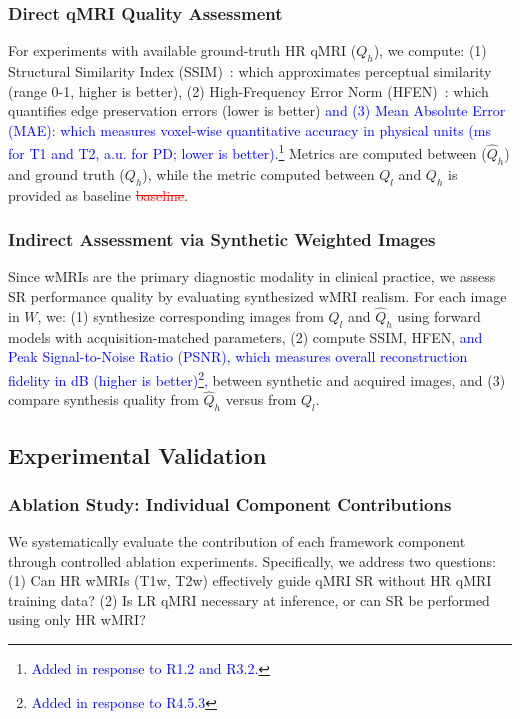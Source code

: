 \documentclass[journal,twoside,web]{ieeecolor}
\newcommand{\added}[1]{\textcolor{blue}{#1}}      %
\newcommand{\deleted}[1]{\textcolor{red}{\st{#1}}} %
\begin{document}
\subsubsection{Direct qMRI Quality Assessment}
For experiments with available ground-truth HR qMRI ($Q_h$), we compute: (1) Structural Similarity Index (SSIM)~\cite{b24}: which approximates perceptual similarity (range 0-1, higher is better), (2) High-Frequency Error Norm (HFEN)~\cite{b25}: which quantifies edge preservation errors (lower is better) \added{and (3) Mean Absolute Error (MAE): which measures voxel-wise quantitative accuracy in physical units (ms for T1 and T2, a.u. for PD; lower is better).\footnote{\textcolor{blue}{Added in response to R1.2 and R3.2.}}} Metrics are computed between ($\hat{Q}_h$) and ground truth ($Q_h$), while the metric computed between $Q_l$ and $Q_h$ is provided as baseline \deleted{baseline}.

\subsubsection{Indirect Assessment via Synthetic Weighted Images}
Since wMRIs are the primary diagnostic modality in clinical practice, 
we assess SR performance quality by evaluating synthesized wMRI 
realism. For each image in $W$, we: (1) synthesize corresponding 
images from $Q_l$ and $\hat{Q}_h$ using forward models with 
acquisition-matched parameters, (2) compute SSIM, HFEN, \added{and 
Peak Signal-to-Noise Ratio (PSNR), which measures overall 
reconstruction fidelity in dB (higher is better)\footnote{\textcolor{blue}{Added in response to R4.5.3}},} between synthetic 
and acquired images, and (3) compare synthesis quality from $\hat{Q}_h$ 
versus from $Q_l$.


\subsection{Experimental Validation}

\subsubsection{Ablation Study: Individual Component Contributions}
\label{Ablation Study: Individual Component Contributions}
We systematically evaluate the contribution of each framework component through controlled ablation experiments. Specifically, we address two questions: (1) Can HR wMRIs (T1w, T2w) effectively guide qMRI SR without HR qMRI training data? (2) Is LR qMRI necessary at inference, or can SR be performed using only HR wMRI?
\end{document}
